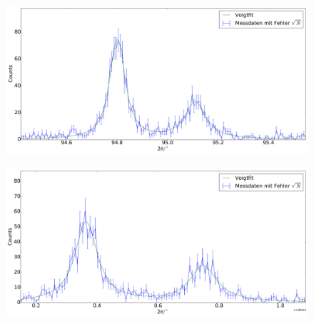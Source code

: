 \begin{figure}[H]
\begin{minipage}{.52\textwidth}
  \centering
  \includegraphics[scale=0.18]{messung_pulver_7}
  \label{fig:pul_mess_7}
\end{minipage}
\hspace{0.2cm}
\begin{minipage}{.52\textwidth}
  \centering
  \includegraphics[scale=0.18]{messung_pulver_8}
  \label{fig:pul_mess_8}
\end{minipage}
\end{figure}
